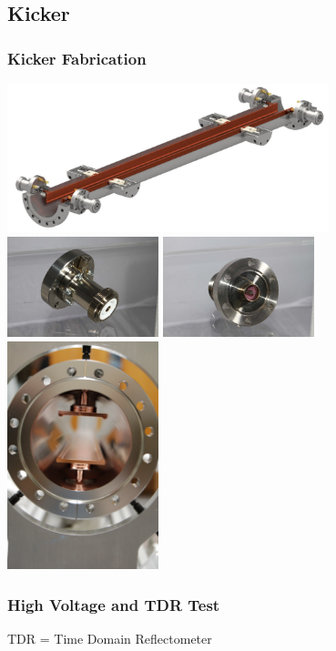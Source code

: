 \documentclass[professionalfonts,t]{beamer}
\begin{document}
{\subsection{Kicker}
\begin{frame}
	\frametitle{Kicker Fabrication}
	\centering
	\includegraphics[width=0.7\textwidth]{../../tex/images/kicker}\\
	\includegraphics[width=0.33\textwidth]{../../tex/images/FID_feedthrough1}%
	\includegraphics[width=0.33\textwidth]{../../tex/images/FID_feedthrough2}%
	\includegraphics[width=0.33\textwidth]{../../tex/images/kicker_plates}
\end{frame}

\begin{frame}
	\frametitle{High Voltage and TDR Test}
	TDR = Time Domain Reflectometer
	\vspace{1em}
	

\end{frame}}
\end{document}
